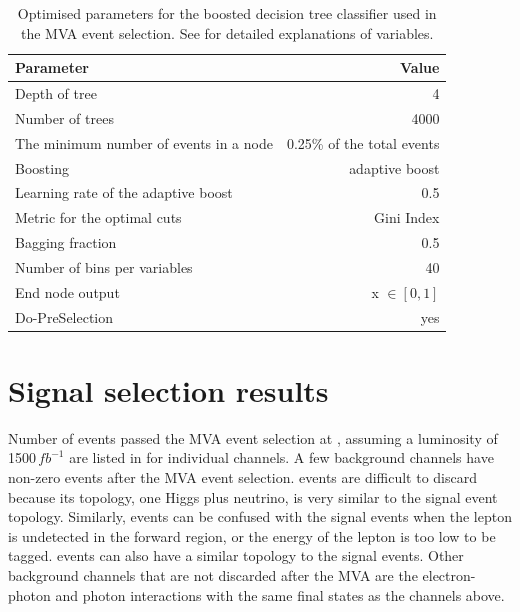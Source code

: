 \begin{table}[!tbp]\centering

\begin{tabular}{lr}
\hline \hline
 Parameter &  Value \\
\hline
Depth of tree & 4 \\
Number of trees & 4000 \\
The minimum number of events in a node &  0.25\% of the total events \\
Boosting & adaptive boost \\
Learning rate of the adaptive boost & 0.5 \\
Metric for the optimal cuts & Gini Index \\
Bagging fraction & 0.5 \\
Number of bins per variables & 40 \\
End node output & x $\in [0,1]$ \\
Do-PreSelection & yes \\
\hline \hline
\end{tabular}

\caption
{Optimised parameters for the boosted decision tree classifier used in the MVA event selection. See  for detailed explanations of variables.}
\label{tab:doubleHiggsBDTparameters}
\end{table}

\section{Signal selection results}
\label{sec:doubleHiggsSignalSelResult}

Number of events passed the MVA event selection at , assuming a luminosity of 1500\,$fb^{-1}$  are listed in  for individual channels. A few  background channels have non-zero events after the MVA event selection. \eeTo{\Pquark \APquark \PHiggs \Pnu \APnu} events are difficult to discard because its topology, one Higgs plus neutrino, is very similar to the signal event topology. Similarly, \eeTo{ \Pquark \Pquark \Pquark \Pquark \Plepton \Pnu} events can be confused with the signal events when the lepton is undetected in the forward region, or the energy of the lepton is too low to be tagged. \eeTo{ \Pquark \Pquark \Pquark \Pquark \Pnu \APnu} events can also have a similar topology to the signal events. Other background channels that are not discarded after the MVA are the electron-photon and photon interactions with the same final states as the channels above.


